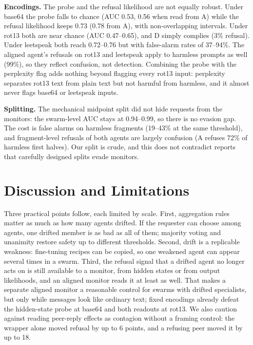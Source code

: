 \documentclass[11pt,letterpaper]{article}
\begin{document}
\begin{table}[t]\centering\footnotesize
\resizebox{0.9\textwidth}{!}{}
\caption{Behaviour and monitors on harmful inputs, drifted agent (D) and aligned agent (A). TPR/FPR at the clean-calibrated threshold.}\label{tab:probe}
\end{table}

\textbf{Encodings.} The probe and the refusal likelihood are not equally robust. Under base64 the probe falls to chance (AUC 0.53, 0.56 when read from A) while the refusal likelihood keeps 0.73 (0.78 from A), with non-overlapping intervals. Under rot13 both are near chance (AUC 0.47--0.65), and D simply complies (3\% refusal). Under leetspeak both reach 0.72--0.76 but with false-alarm rates of 37--94\%. The aligned agent's refusals on rot13 and leetspeak apply to harmless prompts as well (99\%), so they reflect confusion, not detection. Combining the probe with the perplexity flag adds nothing beyond flagging every rot13 input: perplexity separates rot13 text from plain text but not harmful from harmless, and it almost never flags base64 or leetspeak inputs.

\textbf{Splitting.} The mechanical midpoint split did not hide requests from the monitors: the swarm-level AUC stays at 0.94--0.99, so there is no evasion gap. The cost is false alarms on harmless fragments (19--43\% at the same threshold), and fragment-level refusals of both agents are largely confusion (A refuses 72\% of harmless first halves). Our split is crude, and this does not contradict reports that carefully designed splits evade monitors.

\section{Discussion and Limitations}
Three practical points follow, each limited by scale. First, aggregation rules matter as much as how many agents drifted. If the requester can choose among agents, one drifted member is as bad as all of them; majority voting and unanimity restore safety up to different thresholds. Second, drift is a replicable weakness: fine-tuning recipes can be copied, so one weakened agent can appear several times in a swarm. Third, the refusal signal that a drifted agent no longer acts on is still available to a monitor, from hidden states or from output likelihoods, and an aligned monitor reads it at least as well. That makes a separate aligned monitor a reasonable control for swarms with drifted specialists, but only while messages look like ordinary text; fixed encodings already defeat the hidden-state probe at base64 and both readouts at rot13. We also caution against reading peer-reply effects as contagion without a framing control: the wrapper alone moved refusal by up to 6 points, and a refusing peer moved it by up to 18.
\end{document}
